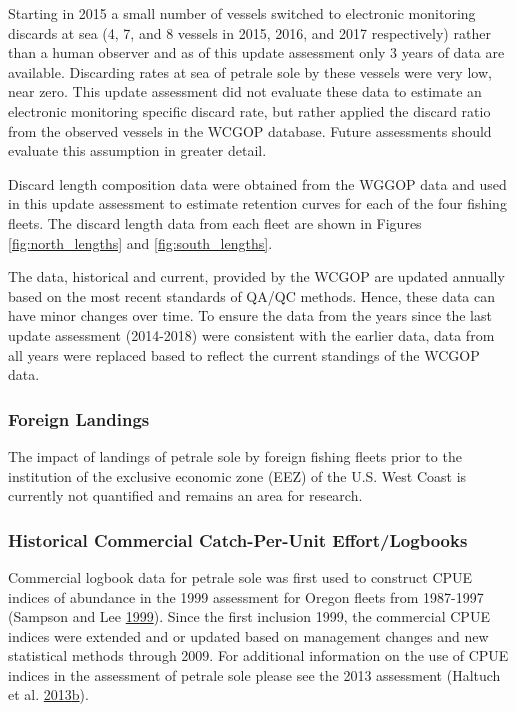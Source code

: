 \documentclass[12pt,]{article}
\begin{document}
Starting in 2015 a small number of vessels switched to electronic
monitoring discards at sea (4, 7, and 8 vessels in 2015, 2016, and 2017
respectively) rather than a human observer and as of this update
assessment only 3 years of data are available. Discarding rates at sea
of petrale sole by these vessels were very low, near zero. This update
assessment did not evaluate these data to estimate an electronic
monitoring specific discard rate, but rather applied the discard ratio
from the observed vessels in the WCGOP database. Future assessments
should evaluate this assumption in greater detail.

Discard length composition data were obtained from the WGGOP data and
used in this update assessment to estimate retention curves for each of
the four fishing fleets. The discard length data from each fleet are
shown in Figures \ref{fig:north_lengths} and \ref{fig:south_lengths}.

The data, historical and current, provided by the WCGOP are updated
annually based on the most recent standards of QA/QC methods. Hence,
these data can have minor changes over time. To ensure the data from the
years since the last update assessment (2014-2018) were consistent with
the earlier data, data from all years were replaced based to reflect the
current standings of the WCGOP data.

\subsubsection{Foreign Landings}\label{foreign-landings}

The impact of landings of petrale sole by foreign fishing fleets prior
to the institution of the exclusive economic zone (EEZ) of the U.S. West
Coast is currently not quantified and remains an area for research.

\subsubsection{Historical Commercial Catch-Per-Unit
Effort/Logbooks}\label{historical-commercial-catch-per-unit-effortlogbooks}

Commercial logbook data for petrale sole was first used to construct
CPUE indices of abundance in the 1999 assessment for Oregon fleets from
1987-1997 (Sampson and Lee
\protect\hyperlink{ref-sampson_assessment_1999}{1999}). Since the first
inclusion 1999, the commercial CPUE indices were extended and or updated
based on management changes and new statistical methods through 2009.
For additional information on the use of CPUE indices in the assessment
of petrale sole please see the 2013 assessment (Haltuch et al.
\protect\hyperlink{ref-haltuch_status_2013}{2013}\protect\hyperlink{ref-haltuch_status_2013}{b}).
\end{document}
